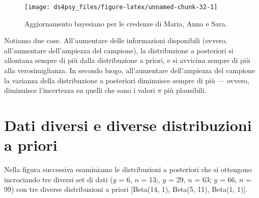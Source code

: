 \documentclass[
  11pt,
]{krantz}
\theoremstyle{definition}
\theoremstyle{definition}
\theoremstyle{definition}
\theoremstyle{definition}
\theoremstyle{remark}
\begin{document}
\begin{figure}[h]

{\centering \texttt{[image: ds4psy\_files/figure-latex/unnamed-chunk-32-1]} 

}

\caption{Aggiornamento bayesiano per le credenze di Maria, Anna e Sara.}\label{fig:unnamed-chunk-32}
\end{figure}

Notiamo due cose. All'aumentare delle informazioni disponibili (ovvero, all'aumentare dell'ampiezza del campione), la distribuzione a posteriori si allontana sempre di più dalla distribuzione a priori, e si avvicina sempre di più alla verosimiglianza. In secondo luogo, all'aumentare dell'ampiezza del campione la varianza della distribuzione a posteriori diminuisce sempre di più --- ovvero, diminuisce l'incertezza su quelli che sono i valori \(\pi\) più plausibili.

\hypertarget{dati-diversi-e-diverse-distribuzioni-a-priori}{%
\section{Dati diversi e diverse distribuzioni a priori}\label{dati-diversi-e-diverse-distribuzioni-a-priori}}

Nella figura successiva esaminiamo le distribuzioni a posteriori che si ottengono incrociando tre diversi set di dati (\(y\) = 6, \(n\) = 13;, \(y\) = 29, \(n\) = 63; \(y\) = 66, \(n\) = 99) con tre diverse distribuzioni a priori {[}Beta(14, 1), Beta(5, 11), Beta(1, 1){]}.
\end{document}

